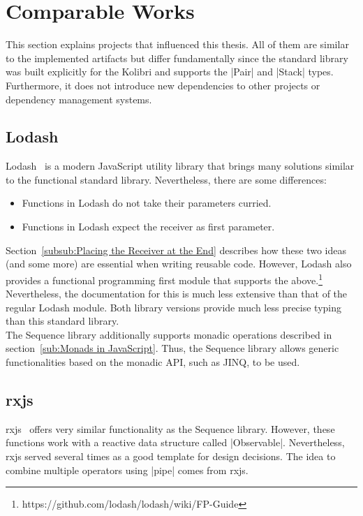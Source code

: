 \section{Comparable Works} %
\label{sec:Comparable Works}
This section explains projects that influenced this thesis. All of them are
similar to the implemented artifacts but differ fundamentally since the
standard library was built explicitly for the Kolibri and supports the |Pair|
and |Stack| types. Furthermore, it does not introduce new dependencies to other
projects or dependency management systems.

\subsection{Lodash} %
\label{sub:Lodash}
Lodash~\cite{lodash_2023} is a modern JavaScript utility library that brings many solutions
similar to the functional standard library. Nevertheless, there are some differences:
\begin{itemize}
  \item Functions in Lodash do not take their parameters curried.
  \item Functions in Lodash expect the receiver as first parameter.
\end{itemize}
Section~\ref{subsub:Placing the Receiver at the End} describes how these two
ideas (and some more) are essential when writing reusable code. However, Lodash
also provides a functional programming first module that supports the
above.\footnote{https://github.com/lodash/lodash/wiki/FP-Guide}
Nevertheless, the documentation for this is much less extensive than that of
the regular Lodash module. Both library versions provide much less precise
typing than this standard library.\\
The Sequence library additionally supports monadic operations described in
section~\ref{sub:Monads in JavaScript}. Thus, the Sequence
library allows generic functionalities based on the monadic API, such as JINQ,
to be used.

\subsection{rxjs} %
\label{sub:rxjs}
rxjs~\cite{rxjs_2023} offers very similar functionality as the Sequence library.
However, these functions work with a reactive data structure called
|Observable|. Nevertheless, rxjs served several times as a good template for
design decisions. The idea to combine multiple operators using |pipe| comes
from rxjs.

